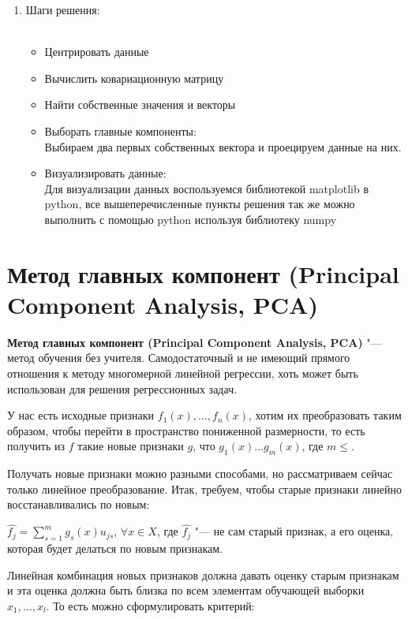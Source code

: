 \begin{enumerate}
   \item Шаги решения:\\\
   \begin{itemize} 
       \item Центрировать данные \\
       \item Вычислить ковариационную матрицу \\
       \item Найти собственные значения и векторы \\ 
       \item Выборать главные компоненты: \\
        Выбираем два первых собственных вектора и проецируем данные на них.
       \item Визуализировать данные: \\
       Для визуализации данных воспользуемся библиотекой matplotlib в python, все вышеперечисленные пункты решения так же можно выполнить с помощью python используя библиотеку numpy       
   \end{itemize}
\end{enumerate}

\section{Метод главных компонент  (Principal Component Analysis, PCA)}

\indent\textbf{Метод главных компонент  (Principal Component Analysis, PCA)} "--- метод обучения без учителя. Самодостаточный и не имеющий прямого отношения к методу многомерной линейной регрессии, хоть  может быть использован для решения регрессионных задач.

У нас есть исходные признаки $f_{1}(x), \dotsc, f_{n}(x)$, хотим их преобразовать таким образом, чтобы перейти в пространство пониженной размерности, то есть получить из $f$ такие новые признаки $g$, что $g_{1}(x)...g_{m}(x)$, где $m\leq$.

Получать новые признаки можно разными способами, но рассматриваем сейчас только линейное преобразование. Итак, требуем, чтобы старые признаки линейно восстанавливались по новым:\par
$\hat{f_j} = \displaystyle\sum_{s=1}^{m} g_s(x)u_{js}$, $\forall x \in X$, где $\hat{f_j}$ "--- не сам старый признак, а его оценка, которая будет делаться по новым признакам. \par Линейная комбинация новых признаков должна давать оценку старым признакам и эта оценка должна быть близка по всем элементам обучающей выборки $x_1, \dotsc, x_l$. То есть можно сформулировать критерий:\par

